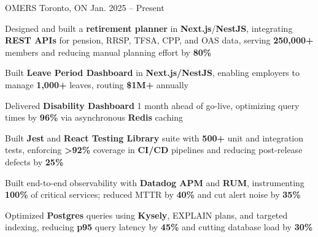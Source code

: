 \documentclass[11pt, a4paper]{awesome-cv}
\begin{document}
\makecvheader[C]


\begin{cventries}


  \cventry
    {\color{lightblue}{ASSOCIATE FULL-STACK ENGINEER}}
    {OMERS}
    {Toronto, ON}
    {Jan. 2025 -- Present}
    {
      \begin{cvitems}
        \item{Designed and built a \textbf{retirement planner} in \textbf{Next.js}/\textbf{NestJS}, integrating \textbf{REST APIs} for pension, RRSP, TFSA, CPP, and OAS data, serving \textbf{250,000+} members and reducing manual planning effort by \textbf{80\%}}
        \item{Built \textbf{Leave Period Dashboard} in \textbf{Next.js/NestJS}, enabling employers to manage \textbf{1,000+} leaves, routing \textbf{\$1M+} annually}
        \item{Delivered \textbf{Disability Dashboard} 1 month ahead of go-live, optimizing query times by \textbf{96\%} via asynchronous \textbf{Redis} caching}
        \item{Built \textbf{Jest} and \textbf{React Testing Library} suite with \textbf{500+} unit and integration tests, enforcing \textbf{>92\%} coverage in \textbf{CI/CD} pipelines and reducing post-release defects by \textbf{25\%}}
        \item{Built end-to-end observability with \textbf{Datadog APM} and \textbf{RUM}, instrumenting \textbf{100\%} of critical services; reduced MTTR by \textbf{40\%} and cut alert noise by \textbf{35\%}}
        \item{Optimized \textbf{Postgres} queries using \textbf{Kysely}, EXPLAIN plans, and targeted indexing, reducing \textbf{p95} query latency by \textbf{45\%} and cutting database load by \textbf{30\%}}
      \end{cvitems}
    }

  \vspace{3mm}


\end{cventries}
\end{document}
